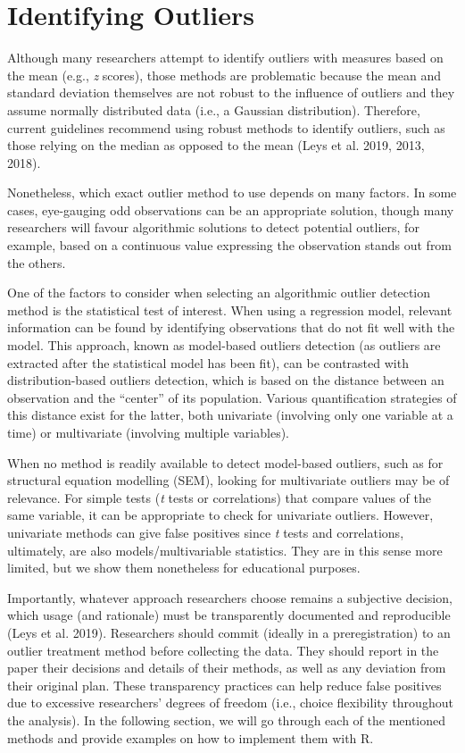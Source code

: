 \documentclass{article}
\begin{document}
\hypertarget{identifying-outliers}{%
\section{Identifying Outliers}\label{identifying-outliers}}

Although many researchers attempt to identify outliers with measures
based on the mean (e.g., \emph{z} scores), those methods are problematic
because the mean and standard deviation themselves are not robust to the
influence of outliers and they assume normally distributed data (i.e., a
Gaussian distribution). Therefore, current guidelines recommend using
robust methods to identify outliers, such as those relying on the median
as opposed to the mean (Leys et al. 2019, 2013, 2018).

Nonetheless, which exact outlier method to use depends on many factors.
In some cases, eye-gauging odd observations can be an appropriate
solution, though many researchers will favour algorithmic solutions to
detect potential outliers, for example, based on a continuous value
expressing the observation stands out from the others.

One of the factors to consider when selecting an algorithmic outlier
detection method is the statistical test of interest. When using a
regression model, relevant information can be found by identifying
observations that do not fit well with the model. This approach, known
as model-based outliers detection (as outliers are extracted after the
statistical model has been fit), can be contrasted with
distribution-based outliers detection, which is based on the distance
between an observation and the ``center'' of its population. Various
quantification strategies of this distance exist for the latter, both
univariate (involving only one variable at a time) or multivariate
(involving multiple variables).

When no method is readily available to detect model-based outliers, such
as for structural equation modelling (SEM), looking for multivariate
outliers may be of relevance. For simple tests (\emph{t} tests or
correlations) that compare values of the same variable, it can be
appropriate to check for univariate outliers. However, univariate
methods can give false positives since \emph{t} tests and correlations,
ultimately, are also models/multivariable statistics. They are in this
sense more limited, but we show them nonetheless for educational
purposes.

Importantly, whatever approach researchers choose remains a subjective
decision, which usage (and rationale) must be transparently documented
and reproducible (Leys et al. 2019). Researchers should commit (ideally
in a preregistration) to an outlier treatment method before collecting
the data. They should report in the paper their decisions and details of
their methods, as well as any deviation from their original plan. These
transparency practices can help reduce false positives due to excessive
researchers' degrees of freedom (i.e., choice flexibility throughout the
analysis). In the following section, we will go through each of the
mentioned methods and provide examples on how to implement them with R.
\end{document}

